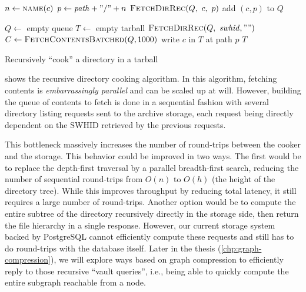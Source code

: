 \begin{algorithm}[t]
    \begin{algorithmic}
            \State $n \gets \Call{name}{c}$
            \State $p \gets \mathit{path} + "/" + n$
                \State $\Call{FetchDirRec}{Q,~c,~p}$
            \Else
                \State add $(c, p)$ to $Q$
            \EndIf
        \EndFor
        \EndFunction

        \State $Q \gets$ empty queue  
        \State $T \gets$ empty tarball  
        \State $\Call{FetchDirRec}{Q,~\mathit{swhid}, ""}$
        \State $C \gets \Call{FetchContentsBatched}{Q, 1000}$
            \State write $c$ in $T$ at path $p$
        \EndFor
        \State \Return $T$
        \EndFunction
    \end{algorithmic}

    \caption{Recursively ``cook'' a directory in a tarball}%
    \label{algo:cooking-directory}
\end{algorithm}


 shows the recursive directory cooking
algorithm.
In this algorithm, fetching contents is \emph{embarrassingly
parallel} and can be scaled up at will. However, building the queue of contents
to fetch is done in a sequential fashion with several directory listing
requests sent to the archive storage, each request being directly dependent on
the SWHID retrieved by the previous requests.

This bottleneck massively increases the number of round-trips between the cooker
and the storage. This behavior could be improved in two ways. The first
would be to replace the depth-first traversal by a parallel breadth-first
search, reducing the number of sequential round-trips from $O(n)$ to $O(h)$
(the height of the directory tree). While this improves throughput by reducing
total latency, it still requires a large number of round-trips.
Another option would be to compute the entire subtree of the directory
recursively directly in the storage side, then return the file hierarchy in a
single response. However, our current storage system backed by PostgreSQL
cannot efficiently compute these requests and still has to do round-trips with
the database itself. Later in the thesis (\cref{chp:graph-compression}), we
will explore ways based on graph compression to efficiently reply to those
recursive ``vault queries'', i.e., being able to quickly compute the entire
subgraph reachable from a node.


